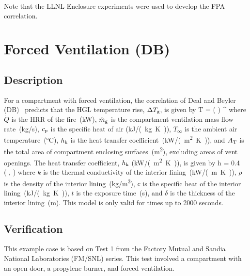 Note that the LLNL Enclosure experiments were used to develop the FPA correlation.


\clearpage


\section{Forced Ventilation (DB)}

\subsection*{Description}

For a compartment with forced ventilation, the correlation of Deal and Beyler (DB)~\cite{SFPE:Walton} predicts that the HGL temperature rise, $\Delta T\sb{g}$, is given by
\be
\Delta T = \left(  \right) \quad ^
\label{eq:DB}
\ee
where $\dot Q$ is the HRR of the fire~(\si{kW}), $\dot m\sb{g}$ is the compartment ventilation mass flow rate~(\si{kg/s}), $c\sb{p}$ is the specific heat of air (\si{kJ/(kg.K)}), $T_\infty$ is the ambient air temperature~(\si{\celsius}), $h\sb{k}$ is the heat transfer coefficient~(\si{kW/(m^2.K)}), and $A\sb{T}$ is the total area of compartment enclosing surfaces~(\si{m^2}), excluding areas of vent openings. The heat transfer coefficient, $h\sb{k}$ (\si{kW/(m^2.K)}), is given by
\be
h = 0.4\  \left(  ,  \right)
\label{eq:DB_hk}
\ee
where $k$ is the thermal conductivity of the interior lining~(\si{kW/(m.K)}), $\rho$ is the density of the interior lining~(\si{kg/m^3}), $c$ is the specific heat of the interior lining~(\si{kJ/(kg.K)}), $t$ is the exposure time~(\si{\second}), and $\delta$ is the thickness of the interior lining~(\si{m}). This model is only valid for times up to 2000 seconds.


\clearpage


\subsection*{Verification}

This example case is based on Test 1 from the Factory Mutual and Sandia National Laboratories (FM/SNL) series. This test involved a compartment with an open door, a propylene burner, and forced ventilation.

